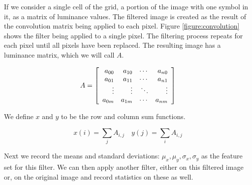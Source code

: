 If we consider a single cell of the grid, a portion of the image with one symbol in it,
as a matrix of luminance values. The filtered image is created as the result of the convolution
matrix being applied to each pixel. Figure \ref{figure:convolution} shows the filter being applied
to a single pixel. The filtering process repeats for each pixel until all pixels have been replaced.
The resulting image has a luminance matrix, which we will call $A$.

\[A = \left [
    \begin{array}{r r r r}
        a_{00} & a_{10} & \cdots & a_{n0} \\
        a_{01} & a_{11} & \cdots & a_{n1}\\
        \vdots  & \vdots  & \ddots & \vdots\\
        a_{0m} & a_{1m} & \cdots & a_{nm}\\
    \end{array}
\right ] \]

We define $x$ and $y$ to be the row and column sum functions.

\begin{equation}
x(i) = \sum_{j}{A_{i,j}} \quad
y(j) = \sum_{i}{A_{i,j}}
\end{equation}

Next we record the means and standard deviations: $\mu_x, \mu_y, \sigma_x, \sigma_y$ as the feature set for this filter.
We can then apply another filter, either on this filtered image or, on the original image
and record statistics on these as well.
